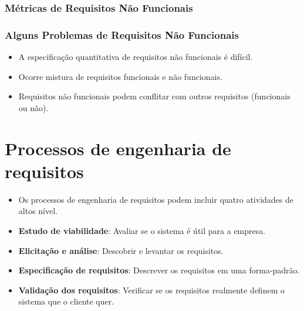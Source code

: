 \documentclass[a4paper, 11pt]{article}
\begin{document}
\subsubsection{Métricas de Requisitos Não Funcionais}


\subsubsection{Alguns Problemas de Requisitos Não Funcionais}
\begin{itemize}
	\item A especificação quantitativa de requisitos não funcionais é difícil.
	\item Ocorre mistura de requisitos funcionais e não funcionais.
	\item Requisitos não funcionais podem conflitar com outros requisitos (funcionais ou não).
\end{itemize}

\section{Processos de engenharia de requisitos}
\begin{itemize}
    \item Os processos de engenharia de requisitos podem incluir quatro atividades de altos nível.
    \item \textbf{Estudo de viabilidade}: Avaliar se o sistema é útil para a empresa.
    \item \textbf{Elicitação e análise}: Descobrir e levantar os requisitos.
    \item \textbf{Especificação de requisitos}: Descrever os requisitos em uma forma-padrão.
    \item \textbf{Validação dos requisitos}: Verificar se os requisitos realmente definem o sistema que o cliente quer.
\end{itemize}

\end{document}
